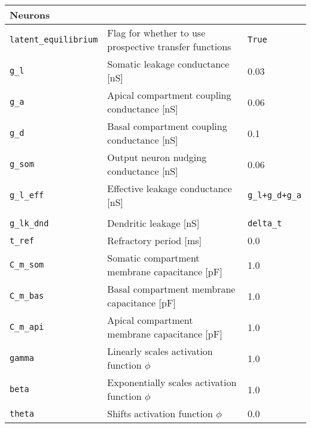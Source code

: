 \begin{table}
\begin{center}
\begin{tabular}{p{}p{}p{}}
      \\
      \textbf{Neurons}
      \\\hline
      \texttt{latent\_equilibrium} & Flag for whether to use prospective transfer functions                      &
      \texttt{True}
      \\
      \texttt{g\_l}                & Somatic leakage conductance [nS]                                            & 0.03
      \\
      \texttt{g\_a}                & Apical compartment coupling conductance [nS]                                & 0.06
      \\
      \texttt{g\_d}                & Basal compartment coupling conductance [nS]                                 & 0.1
      \\
      \texttt{g\_som}              & Output neuron nudging conductance [nS]                                      & 0.06
      \\
      \texttt{g\_l\_eff}           & Effective leakage conductance [nS]                                          &
      \texttt{g\_l+g\_d+g\_a}
      \\
      \\
      \texttt{g\_lk\_dnd}          & Dendritic leakage [nS]                                                      &
      \texttt{delta\_t}
      \\
      \texttt{t\_ref}              & Refractory period [ms]                                                      & 0.0
      \\
      \texttt{C\_m\_som}           & Somatic compartment membrane capacitance [pF]                               & 1.0
      \\
      \texttt{C\_m\_bas}           & Basal compartment membrane capacitance [pF]                                 & 1.0
      \\
      \texttt{C\_m\_api}           & Apical compartment membrane capacitance [pF]                                & 1.0
      \\
      \texttt{gamma}               & Linearly scales  activation function $\phi$                                 & 1.0
      \\
      \texttt{beta}                & Exponentially scales  activation function $\phi$                            & 1.0
      \\
      \texttt{theta}               & Shifts  activation function $\phi$                                          & 0.0
      \\


\end{tabular}
\end{center}
\end{table}
